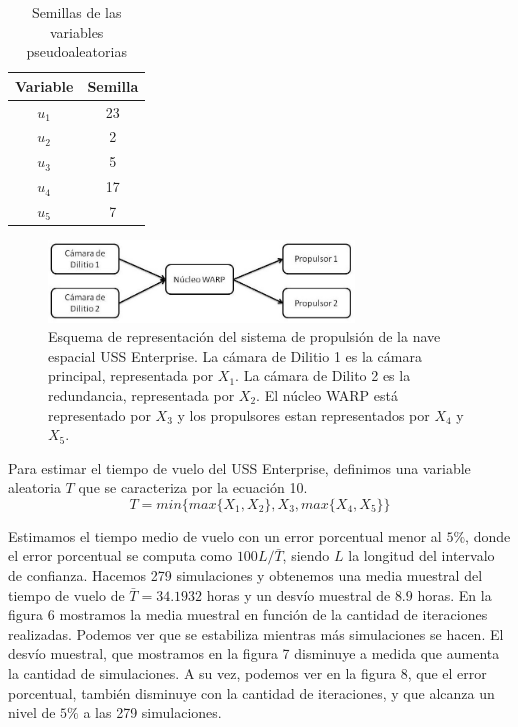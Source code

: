 \documentclass[10pt,journal,compsoc]{IEEEtran}
\begin{document}
\begin{table}[!t]
\renewcommand{\arraystretch}{1.3}
\caption{Semillas de las variables pseudoaleatorias}
\centering
\begin{tabular}{c c}
\hline
\hline
Variable  & Semilla\\
\hline
$u_1$ &  23\\
$u_2$ & 2 \\
$u_3$ & 5 \\
$u_4$ & 17  \\
$u_5$ & 7 \\
\hline
\hline
\end{tabular}
\label{tab:sim}
\end{table}






\begin{figure}[t]
\label{fig:3d}
\begin{center}
\centering
\includegraphics[width=3.2in]{propulsor.jpg}
\caption{Esquema de representaci\'on del sistema de propulsi\'on de la nave espacial USS Enterprise.  La c\'amara de Dilitio 1 es la c\'amara principal, representada por $X_1$. La c\'amara de Dilito 2 es la redundancia, representada por $X_2$. El n\'ucleo WARP est\'a representado
 por $X_3$ y los propulsores estan representados por $X_4$ y $X_5$.}
\end{center}
\end{figure}

Para estimar el tiempo de vuelo del USS Enterprise, definimos una variable aleatoria $T$ que se caracteriza por la ecuaci\'on 10.
\begin{equation}
T = min\{ max\{X_1, X_2\}, X_3, max\{X_4, X_5\} \}
\end{equation}


\indent Estimamos el tiempo medio de vuelo con un error porcentual menor al $5\%$, donde el error porcentual se computa
como $100L/\bar{T}$, siendo $L$ la longitud del intervalo de confianza.  Hacemos 279 simulaciones y obtenemos una
media muestral del tiempo de vuelo de $\bar{T}=34.1932$ horas y un desv\'io muestral de $8.9$ horas.
En la figura 6 mostramos la media muestral en funci\'on de la cantidad de iteraciones realizadas.  Podemos ver que se 
estabiliza mientras m\'as simulaciones se hacen. El desv\'io muestral, que
mostramos en la figura 7 disminuye a medida que aumenta la cantidad de simulaciones.  A su vez, podemos ver en la figura 8,
que el error porcentual, tambi\'en disminuye con la cantidad de iteraciones, y que alcanza un nivel de $5\%$ a las 279 simulaciones.
\end{document}
